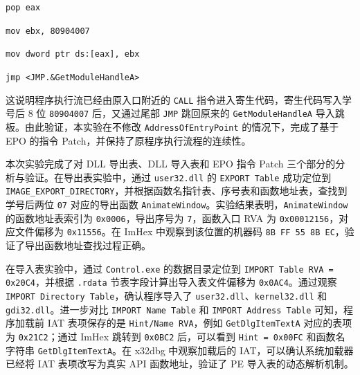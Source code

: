 ﻿\documentclass[12pt]{ctexart}
\begin{document}
\begin{center}
\texttt{pop eax}
\end{center}

\begin{center}
\texttt{mov ebx, 80904007}
\end{center}

\begin{center}
\texttt{mov dword ptr ds:[eax], ebx}
\end{center}

\begin{center}
\texttt{jmp <JMP.\&GetModuleHandleA>}
\end{center}

这说明程序执行流已经由原入口附近的 \texttt{CALL} 指令进入寄生代码，寄生代码写入学号后 8 位 \texttt{80904007} 后，又通过尾部 \texttt{JMP} 跳回原来的 \texttt{GetModuleHandleA} 导入跳板。由此验证，本实验在不修改 \texttt{AddressOfEntryPoint} 的情况下，完成了基于 EPO 的指令 Patch，并保持了原程序执行流程的连续性。

\FloatBarrier


本次实验完成了对 DLL 导出表、DLL 导入表和 EPO 指令 Patch 三个部分的分析与验证。在导出表实验中，通过 \texttt{user32.dll} 的 \texttt{EXPORT Table} 成功定位到 \texttt{IMAGE\_EXPORT\_DIRECTORY}，并根据函数名指针表、序号表和函数地址表，查找到学号后两位 \texttt{07} 对应的导出函数 \texttt{AnimateWindow}。实验结果表明，\texttt{AnimateWindow} 的函数地址表索引为 \texttt{0x0006}，导出序号为 \texttt{7}，函数入口 RVA 为 \texttt{0x00012156}，对应文件偏移为 \texttt{0x11556}。在 ImHex 中观察到该位置的机器码 \texttt{8B FF 55 8B EC}，验证了导出函数地址查找过程正确。

在导入表实验中，通过 \texttt{Control.exe} 的数据目录定位到 \texttt{IMPORT Table RVA = 0x20C4}，并根据 \texttt{.rdata} 节表字段计算出导入表文件偏移为 \texttt{0x0AC4}。通过观察 \texttt{IMPORT Directory Table}，确认程序导入了 \texttt{user32.dll}、\texttt{kernel32.dll} 和 \texttt{gdi32.dll}。进一步对比 \texttt{IMPORT Name Table} 和 \texttt{IMPORT Address Table} 可知，程序加载前 IAT 表项保存的是 \texttt{Hint/Name RVA}，例如 \texttt{GetDlgItemTextA} 对应的表项为 \texttt{0x21C2}；通过 ImHex 跳转到 \texttt{0x0BC2} 后，可以看到 \texttt{Hint = 0x00FC} 和函数名字符串 \texttt{GetDlgItemTextA}。在 x32dbg 中观察加载后的 IAT，可以确认系统加载器已经将 IAT 表项改写为真实 API 函数地址，验证了 PE 导入表的动态解析机制。
\end{document}
